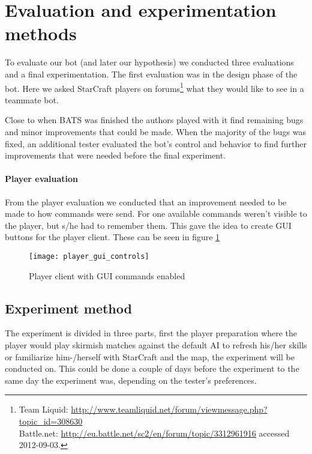 \section{Evaluation and experimentation methods}
To evaluate our bot (and later our hypothesis) we conducted three evaluations and a final experimentation. The first evaluation was in the design phase of the bot. Here we asked StarCraft players on forums\footnote{
Team Liquid: \url{http://www.teamliquid.net/forum/viewmessage.php?topic_id=308630}\\
Battle.net: \url{http://eu.battle.net/sc2/en/forum/topic/3312961916} accessed 2012-09-03.} what they would like to see in a teammate bot.

Close to when BATS was finished the authors played with it find remaining bugs and minor improvements that could be made. When the majority of the bugs was fixed, an additional tester evaluated the bot’s control and behavior to find further improvements that were needed before the final experiment.

\paragraph{Player evaluation}
From the player evaluation we conducted that an improvement needed to be made to how commands were send. For one available commands weren’t visible to the player, but s/he had to remember them. This gave the idea to create GUI buttons for the player client. These can be seen in figure \ref{fig:player_commands_gui}

\begin{figure}[htb]
\centering
\texttt{[image: player\_gui\_controls]}
\caption{Player client with GUI commands enabled}
\label{fig:player_commands_gui}
\end{figure}

\subsection{Experiment method}
The experiment is divided in three parts, first the player preparation where the player would play skirmish matches against the default AI to refresh his/her skills or familiarize him-/herself with StarCraft and the map, the experiment will be conducted on. This could be done a couple of days before the experiment to the same day the experiment was, depending on the tester’s preferences.

